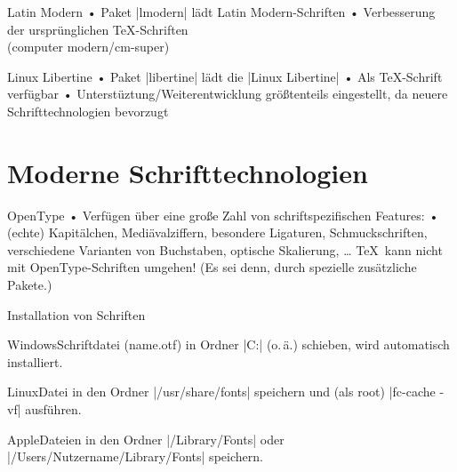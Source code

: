 \begin{frame}[fragile]{Latin Modern}
• Paket |lmodern| lädt Latin Modern-Schriften
• Verbesserung der ursprünglichen \TeX-Schriften\\ (computer modern/cm-super)
\•
\end{frame}

\begin{frame}{Linux Libertine}
• Paket |libertine| lädt die |Linux Libertine|
• Als \TeX-Schrift verfügbar
• Unterstüztung/Weiterentwicklung größtenteils eingestellt, da neuere Schrifttechnologien bevorzugt
\•
\end{frame}

\section{Moderne Schrifttechnologien}

\begin{frame}{OpenType}
• Verfügen über eine große Zahl von schriftspezifischen Features:
• (echte) Kapitälchen, Mediävalziffern, besondere Ligaturen, Schmuckschriften, verschiedene Varianten von Buchstaben, optische Skalierung, …
\•
\pause
\TeX\ kann nicht mit OpenType-Schriften umgehen! (Es sei denn, durch spezielle zusätzliche Pakete.)
\end{frame}

\begin{frame}[fragile]{Installation von Schriften}
\begin{block}{Windows}Schriftdatei (name.otf) in Ordner |C:\WINDOWS\Fonts| (o.\,ä.) schieben, wird automatisch installiert.
\end{block}
\begin{block}{Linux}Datei in den Ordner |/usr/share/fonts| speichern und (als root) |fc-cache -vf| ausführen.
\end{block}
\begin{block}{Apple}Dateien in den Ordner |/Library/Fonts| oder |/Users/Nutzername/Library/Fonts| speichern.
\end{block}
\end{frame}

